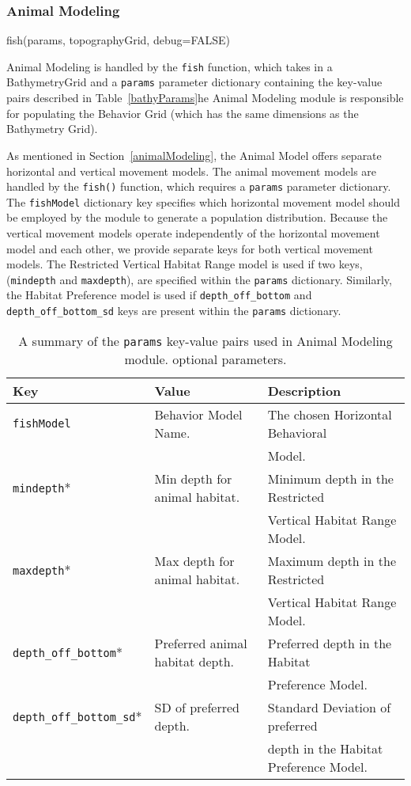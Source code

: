 \subsubsection{Animal Modeling}
fish(params, topographyGrid, debug=FALSE)
	
Animal Modeling is handled by the \texttt{fish} function, which takes in a BathymetryGrid and a \texttt{params} parameter dictionary containing the key-value pairs described in Table~\ref{bathyParams}he Animal Modeling module is responsible for populating the Behavior Grid (which has the same dimensions as the Bathymetry Grid).  

As mentioned in Section~\ref{animalModeling}, the Animal Model offers separate horizontal and vertical movement models.  The animal movement models are handled by the \texttt{fish()} function, which requires a \texttt{params} parameter dictionary.  The \texttt{fishModel} dictionary key specifies which horizontal movement model should be employed by the module to generate a population distribution.  Because the vertical movement models operate independently of the horizontal movement model and each other, we provide separate keys for both vertical movement models.  The Restricted Vertical Habitat Range model is used if two keys, (\texttt{mindepth} and \texttt{maxdepth}), are specified within the \texttt{params} dictionary.  Similarly, the Habitat Preference model is used if \texttt{depth\_off\_bottom} and \texttt{depth\_off\_bottom\_sd} keys are present within the \texttt{params} dictionary.  

\begin{table}[ht]
	\begin{tabular}{l l l}
		Key									&	Value 							&	Description\\
		\hline
		\texttt{fishModel}					& 	Behavior Model Name.			&	The chosen Horizontal Behavioral\\
					 						&									&    Model.\\
		\texttt{mindepth}*					& 	Min depth for animal habitat.	&	Minimum depth in the Restricted\\
					 						&									&   Vertical Habitat Range Model.\\
		\texttt{maxdepth}*					& 	Max depth for animal habitat.	&	Maximum depth in the Restricted\\
					 						&									&   Vertical Habitat Range Model.\\
		\texttt{depth\_off\_bottom}*		& 	Preferred animal habitat depth.	&   Preferred depth in the Habitat\\
					 						&									&   Preference Model.\\
		\texttt{depth\_off\_bottom\_sd}*	& 	SD of preferred depth.			&   Standard Deviation of preferred\\
					 						&									&   depth in the Habitat Preference Model.\\
	\end{tabular}
	\caption{A summary of the \texttt{params} key-value pairs used in Animal Modeling module.  \newline * optional parameters.
		\label{animalParams}}
\end{table}

